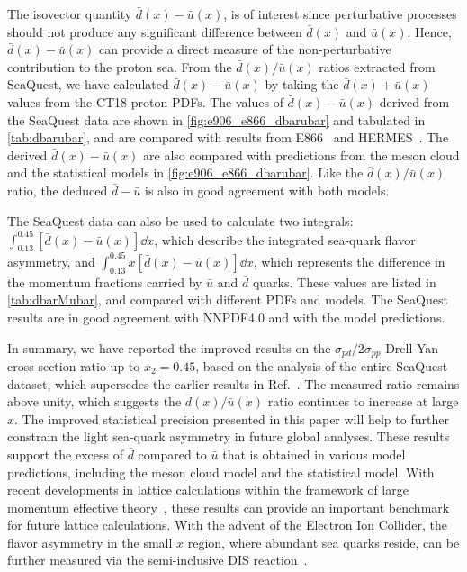 \documentclass[reprint,aps,unsortedaddress,superscriptaddress,prl,floatfix,showpacs,linenumbers]{revtex4-2}
\begin{document}
The isovector quantity $\bar{d}(x) - \bar{u}(x)$,
is of interest since perturbative processes should not produce any significant difference between $\bar{d}(x)$ and $\bar{u}(x)$.
Hence, $\bar{d}(x) - \bar{u}(x)$ can provide a direct measure of the non-perturbative contribution to the proton sea.
From the $\bar{d}(x) / \bar{u}(x)$ ratios extracted from SeaQuest,
we have calculated $\bar{d}(x) - \bar u(x)$ by taking the $\bar{d}(x) + \bar{u}(x)$ values from the CT18 proton PDFs.
The values of $\bar{d}(x)-\bar{u}(x)$ derived from the SeaQuest data are
shown in \cref{fig:e906_e866_dbarubar} and tabulated in \cref{tab:dbarubar},
and are compared with results from E866~\cite{towell2001} and
HERMES~\cite{ackerstaff1998}.
The derived $\bar{d}(x)-\bar{u}(x)$ are also compared with predictions from the meson cloud and the statistical models in \cref{fig:e906_e866_dbarubar}.
Like the $\bar{d}(x) / \bar{u}(x)$ ratio, the deduced $\bar{d}-\bar{u}$ is also in good agreement with both models.

The SeaQuest data can also be used to calculate two integrals:
$\int^{0.45}_{0.13} \left[\bar{d}\left(x\right) - \bar{u}\left(x\right) \right]\dd{x}$,
which describe the integrated sea-quark flavor asymmetry, and
$\int^{0.45}_{0.13} x\left[\bar{d}\left(x\right) - \bar{u}\left(x\right) \right]\dd{x}$,
which represents the difference in the momentum fractions carried
by $\bar{u}$ and $\bar{d}$ quarks.
These values are listed in \cref{tab:dbarMubar}, and compared with different PDFs and models.
The SeaQuest results are in good agreement with NNPDF4.0 and with the model predictions.

In summary, we have reported the improved results on the
$\sigma_{pd}/2\sigma_{pp}$ Drell-Yan cross section ratio up to $x_2=0.45$,
based on the analysis of the entire SeaQuest dataset,
which supersedes the earlier results in Ref.~\cite{dove2021,dove2023}.
The measured ratio remains above unity,
which suggests the $\bar{d}(x)/\bar{u}(x)$ ratio continues to increase at large $x$.
The improved statistical precision presented in this paper will help to
further constrain the light sea-quark asymmetry in future global analyses.
These results support the excess of $\bar{d}$ compared to $\bar{u}$ that is obtained in various model predictions,
including the meson cloud model and the statistical model.
With recent developments in lattice calculations within the framework
of large momentum effective theory~\cite{constantinou2021},
these results can provide an important benchmark for future lattice
calculations.
With the advent of the Electron Ion Collider, the flavor asymmetry in the small $x$ region,
where abundant sea quarks reside, can be further measured via the semi-inclusive DIS reaction~\cite{ackerstaff1998}.
\end{document}
